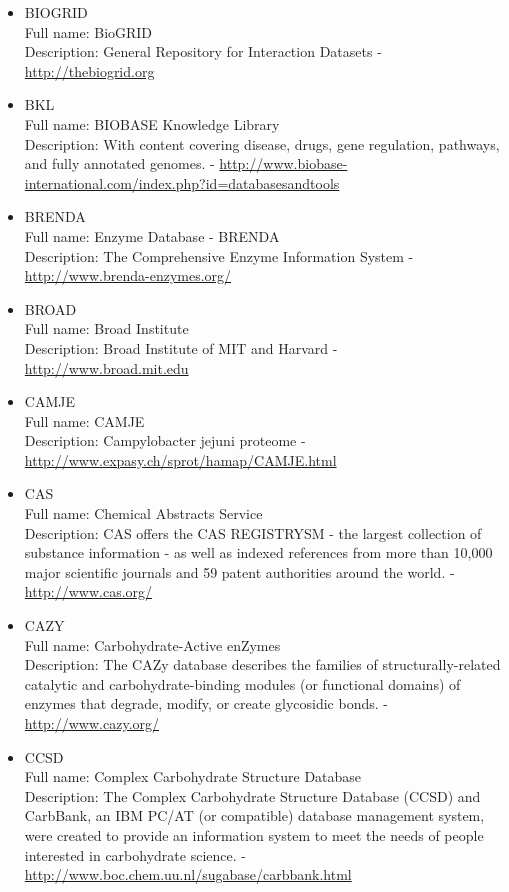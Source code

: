 \begin{itemize}
\item{BIOGRID}\\ Full name: BioGRID\\ Description: General Repository for Interaction Datasets - 
\url{http://thebiogrid.org}

\item{BKL}\\ Full name: BIOBASE Knowledge Library\\ Description: With content covering disease, drugs, gene regulation, pathways, and fully annotated genomes. - 
\url{http://www.biobase-international.com/index.php?id=databasesandtools}

\item{BRENDA}\\ Full name: Enzyme Database - BRENDA\\ Description: The Comprehensive Enzyme Information System - 
\url{http://www.brenda-enzymes.org/}

\item{BROAD}\\ Full name: Broad Institute\\ Description: Broad Institute of MIT and Harvard - 
\url{http://www.broad.mit.edu}

\item{CAMJE}\\ Full name: CAMJE\\ Description: Campylobacter jejuni proteome - 
\url{http://www.expasy.ch/sprot/hamap/CAMJE.html}

\item{CAS}\\ Full name: Chemical Abstracts Service\\ Description: CAS offers the CAS REGISTRYSM - the largest collection of substance information - as well as indexed references from more than 10,000 major scientific journals and 59 patent authorities around the world. - 
\url{http://www.cas.org/}

\item{CAZY}\\ Full name: Carbohydrate-Active enZymes\\ Description: The CAZy database describes the families of structurally-related catalytic and carbohydrate-binding modules (or functional domains) of enzymes that degrade, modify, or create glycosidic bonds. - 
\url{http://www.cazy.org/}

\item{CCSD}\\ Full name: Complex Carbohydrate Structure Database\\ Description: The Complex Carbohydrate Structure Database (CCSD) and CarbBank, an IBM PC/AT (or compatible) database management system, were created to provide an information system to meet the needs of people interested in carbohydrate science. - 
\url{http://www.boc.chem.uu.nl/sugabase/carbbank.html}


\end{itemize}
